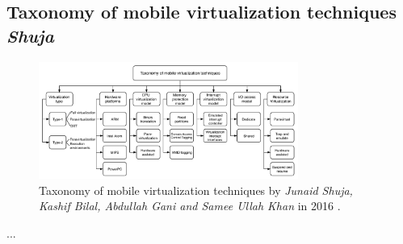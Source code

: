 	\subsection{Taxonomy of mobile virtualization techniques \textit{Shuja}}
	
	\begin{figure}[H]
		\centering
		\includegraphics[width=8.5cm]{images/Shuja2016.pdf}
		\vspace{-0.2cm}
		\caption{Taxonomy of mobile virtualization techniques by \textit{Junaid Shuja, Kashif Bilal, Abdullah Gani and Samee Ullah Khan} in 2016 \cite{Abdulhamid2014}.}
		\label{fig:TaxonomyByShuja}
	\end{figure}

	...